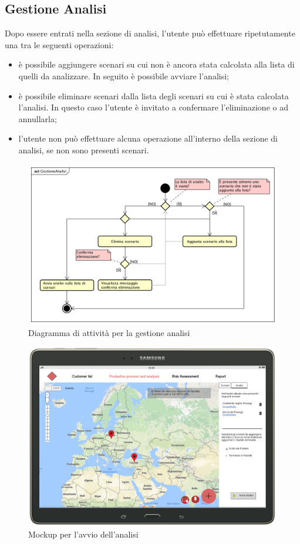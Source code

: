 \newpage
\subsection{Gestione Analisi}
Dopo essere entrati nella sezione di analisi, l'utente può effettuare ripetutamente una tra le seguenti operazioni:
\begin{itemize}
	\item è possibile aggiungere scenari su cui non è ancora stata calcolata alla lista di quelli da analizzare. In seguito è possibile avviare l'analisi;
	\item è possibile eliminare scenari dalla lista degli scenari su cui è stata calcolata l'analisi. In questo caso l'utente è invitato a confermare l'eliminazione o ad annullarla;
	\item l'utente non può effettuare alcuna operazione all'interno della sezione di analisi, se non sono presenti scenari.
\end{itemize} 
\begin{figure}[H]
	\centering
	\includegraphics[width=\textwidth]{img/DiagrammiDiAttivita/GestioneAnalisi.png}
	\caption{Diagramma di attività per la gestione analisi}
\end{figure}
\begin{figure}[H]
	\centering
	\includegraphics[scale=0.29]{img/MockUp/m2.png}
	\caption{Mockup per l'avvio dell'analisi}
\end{figure}
